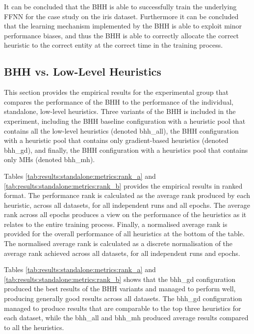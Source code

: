 It can be concluded that the \acs{BHH} is able to successfully train the underlying \acs{FFNN} for the case study on the iris dataset. Furthermore it can be concluded that the learning mechanism implemented by the \acs{BHH} is able to exploit minor performance biases, and thus the \acs{BHH} is able to correctly allocate the correct heuristic to the correct entity at the correct time in the training process.

\subsection{BHH vs. Low-Level Heuristics}\label{sec:results:standalone}

This section provides the empirical results for the experimental group that compares the performance of the \acs{BHH} to the performance of the individual, standalone, low-level heuristics. Three variants of the \acs{BHH} is included in the experiment, including the \acs{BHH} baseline configuration with a heuristic pool that contains all the low-level heuristics (denoted bhh\_all), the \acs{BHH} configuration with a heuristic pool that contains only gradient-based heuristics (denoted bhh\_gd), and finally, the \acs{BHH} configuration with a heuristics pool that contains only \acp{MH} (denoted bhh\_mh).

Tables \ref{tab:results:standalone:metrics:rank_a} and \ref{tab:results:standalone:metrics:rank_b} provides the empirical results in ranked format. The performance rank is calculated as the average rank produced by each heuristic, across all datasets, for all independent runs and all epochs. The average rank across all epochs produces a view on the performance of the heuristics as it relates to the entire training process. Finally, a normalised average rank is provided for the overall performance of all heuristics at the bottom of the table. The normalised average rank is calculated as a discrete normalisation of the average rank achieved across all datasets, for all independent runs and epochs.

Tables \ref{tab:results:standalone:metrics:rank_a} and \ref{tab:results:standalone:metrics:rank_b} shows that the bhh\_gd configuration produced the best results of the \acs{BHH} variants and managed to perform well, producing generally good results across all datasets. The bhh\_gd configuration managed to produce results that are comparable to the top three heuristics for each dataset, while the bhh\_all and bhh\_mh produced average results compared to all the heuristics.

